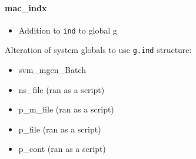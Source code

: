 \documentclass[12pt]{article}
\begin{document}
\paragraph{mac\_indx}
	\begin{itemize}
		\item Addition to \verb|ind| to global g
	\end{itemize}
			
			
Alteration of system globals to use \verb|g.ind| structure:

	\begin{itemize}
		\item svm\_mgen\_Batch
		\item ns\_file (ran as a script)
		\item p\_m\_file (ran as a script)
		\item p\_file (ran as a script)
		\item p\_cont (ran as a script)
	\end{itemize}
	
	
\end{document}
